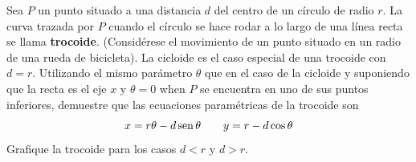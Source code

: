 \item Sea $P$ un punto situado a una distancia $d$ del centro de un círculo de radio $r$. La curva trazada por $P$ cuando el círculo se hace rodar a lo largo de una línea recta se llama \textbf{trocoide}. (Considérese el movimiento de un punto situado en un radio de una rueda de bicicleta). La cicloide es el caso especial de una trocoide con $d = r$. Utilizando el mismo parámetro $\theta$ que en el caso de la cicloide y suponiendo que la recta es el eje $x$ y $\theta = 0$ when $P$ se encuentra en uno de sus puntos inferiores, demuestre que las ecuaciones paramétricas de la trocoide son
    \[ x = r\theta - d\operatorname{sen}\theta \qquad y = r - d\cos\theta \]
    Grafique la trocoide para los casos $d < r$ y $d > r$.
